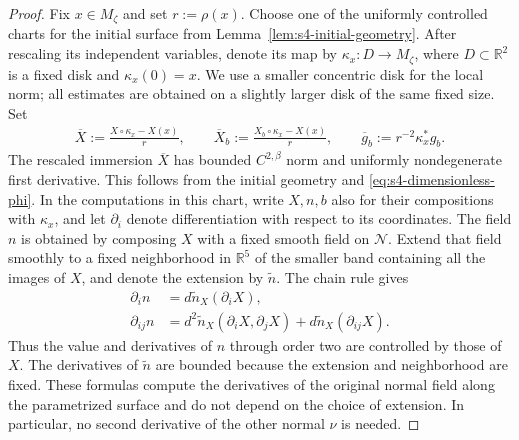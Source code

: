 \documentclass[a4paper,11pt,oneside,reqno]{amsart}
\numberwithin{equation}{section}
\theoremstyle{definition}
\begin{document}
\begin{proof}
    Fix $x\in M_\zeta$ and set $r:=\rho(x)$. Choose one
    of the uniformly controlled charts for the initial
    surface from Lemma~\ref{lem:s4-initial-geometry}. After
    rescaling its independent variables, denote its map by
    $\kappa_x:D\to M_\zeta$, where $D\subset\mathbb R^2$
    is a fixed disk and $\kappa_x(0)=x$. We use a smaller
    concentric disk for the local norm; all estimates are
    obtained on a slightly larger disk of the same fixed
    size. Set
    \begin{align*}
        \overline X:=\frac{X\circ\kappa_x-X(x)}r,\qquad
        \overline X_b:=\frac{X_b\circ\kappa_x-X(x)}r,\qquad
        \overline g_b:=r^{-2}\kappa_x^*g_b.
    \end{align*}
    The rescaled immersion $\overline X$ has bounded
    $C^{2,\beta}$ norm and uniformly nondegenerate first
    derivative. This follows from
    the initial geometry and \eqref{eq:s4-dimensionless-phi}.
    In the computations in this chart, write $X,n,b$ also
    for their compositions with $\kappa_x$, and let
    $\partial_i$ denote differentiation with respect to its
    coordinates. The field $n$ is obtained by composing $X$
    with a fixed smooth field on $\mathcal N$. Extend that
    field smoothly to a fixed neighborhood in $\mathbb R^5$
    of the smaller band containing all the images of $X$,
    and denote the extension by $\widetilde n$. The chain
    rule gives
    \begin{align*}
        \partial_i n&=d\widetilde n_{X}(\partial_iX),\\
        \partial_{ij}n
        &=d^2\widetilde n_{X}(\partial_iX,\partial_jX)
        +d\widetilde n_{X}(\partial_{ij}X).
    \end{align*}
    Thus the value and derivatives of $n$ through order two
    are controlled by those of $X$. The derivatives of
    $\widetilde n$ are bounded because the extension and
    neighborhood are fixed. These formulas compute the derivatives of the original
    normal field along the parametrized surface and do not depend on the choice
    of extension. In particular, no second derivative of
    the other normal $\nu$ is needed.


\end{proof}
\end{document}
